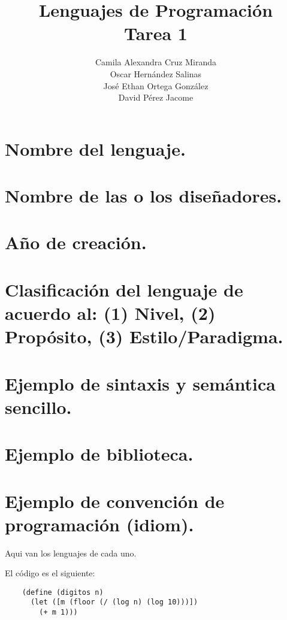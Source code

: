 \documentclass[answers]{exam}
\title{
  \huge Lenguajes de Programación \\[0.5cm]
  \LARGE Tarea 1
}
\author{
  Camila Alexandra Cruz Miranda \\
  Oscar Hernández Salinas \\
  José Ethan Ortega González \\
  David Pérez Jacome \\
}
\begin{document}
\maketitle{}
\begin{questions}
  \begin{parts}
    \part{Nombre del lenguaje.}
    \part{Nombre de las o los diseñadores.}
    \part{Año de creación.}
    \part{Clasificación del lenguaje de acuerdo al: (1) Nivel, (2) Propósito,
      (3) Estilo/Paradigma.}
    \part{Ejemplo de sintaxis y semántica sencillo.}
    \part{Ejemplo de biblioteca.}
    \part{Ejemplo de convención de programación (idiom).}
  \end{parts}
  \begin{solution}
    Aqui van los lenguajes de cada uno.
  \end{solution}

  \begin{solution}
    El código es el siguiente:
    \begin{verbatim}
    (define (digitos n)
      (let ([m (floor (/ (log n) (log 10)))])
        (+ m 1)))
    \end{verbatim}
  \end{solution}


\end{questions}
\end{document}

